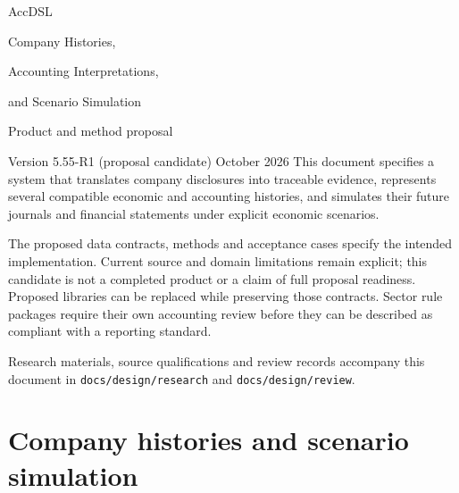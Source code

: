 \documentclass[11pt,a4paper]{report}
\newcommand{\code}[1]{\texttt{#1}}
\begin{document}
\hypersetup{pageanchor=false}
\begin{titlepage}
\vspace*{20mm}
{\sffamily\color{ink}\Huge AccDSL\par}
\vspace{7mm}
{\LARGE Company Histories,\par Accounting Interpretations,\par and Scenario Simulation\par}
\vspace{12mm}
{\Large Product and method proposal\par}
\vspace{5mm}
Version 5.55-R1 (proposal candidate)  October 2026
\vfill
This document specifies a system that translates company disclosures into
traceable evidence, represents several compatible economic and accounting
histories, and simulates their future journals and financial statements under
explicit economic scenarios.

The proposed data contracts, methods and acceptance cases specify the intended
implementation. Current source and domain limitations remain explicit; this
candidate is not a completed product or a claim of full proposal readiness. Proposed libraries can be replaced while preserving those
contracts. Sector rule packages require their own accounting review before
they can be described as compliant with a reporting standard.

\vspace{8mm}
Research materials, source qualifications and review records accompany this
document in \code{docs/design/research} and \code{docs/design/review}.
\end{titlepage}
\hypersetup{pageanchor=true}

\tableofcontents
\clearpage{}
\part{Company histories and scenario simulation}


























\clearpage\label{sim:body-end}
\end{document}
